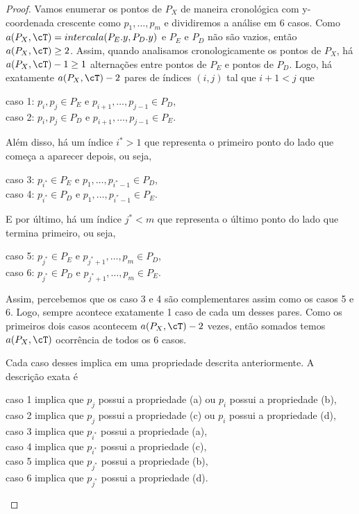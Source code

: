 \begin{proof}
    Vamos enumerar os pontos de $P_X$ de maneira cronológica com y-coordenada crescente como $p_1,\ldots,p_m$ e dividiremos a análise em 6 casos.
    Como $a(P_X,\cT) = intercala(P_E.y,P_D.y)$ e $P_E$ e $P_D$ não são vazios, então $a(P_X,\cT) \geq 2$. Assim, quando analisamos cronologicamente os pontos de $P_X$, há $a(P_X,\cT) - 1 \geq 1$ alternações entre pontos de $P_E$ e pontos de $P_D$. Logo, há exatamente $a(P_X,\cT) - 2$ pares de índices $(i,j)$ tal que $i + 1 < j$ que 
    \begin{center}
        caso 1: $p_i,p_j \in P_E$ e $p_{i+1},\ldots,p_{j-1} \in P_D$,\\
        caso 2: $p_i,p_j \in P_D$ e $p_{i+1},\ldots,p_{j-1} \in P_E$.
    \end{center}

    Além disso, há um índice $i^{*} > 1$ que representa o primeiro ponto do lado que começa a aparecer depois, ou seja,
    \begin{center}
        caso 3: $p_{i^{*}} \in P_E$ e $p_1,\ldots,p_{i^{*}-1} \in P_D$,\\
        caso 4: $p_{i^{*}}  \in P_D$ e $p_1,\ldots,p_{i^{*}-1} \in P_E$.
    \end{center}

    E por último, há um índice $j^{*} < m$ que representa o último ponto do lado que termina primeiro, ou seja,
    \begin{center}
        caso 5: $p_{j^{*}} \in P_E$ e $p_{j^{*} + 1},\ldots,p_m \in P_D$,\\
        caso 6: $p_{j^{*}}  \in P_D$ e $p_{j^{*} + 1},\ldots,p_m \in P_E$.
    \end{center} 

    Assim, percebemos que os caso 3 e 4 são complementares assim como os casos 5 e 6. Logo, sempre acontece exatamente 1 caso de cada um desses pares. Como os primeiros dois casos acontecem $a(P_X,\cT) - 2$ vezes, então somados temos $a(P_X,\cT)$ ocorrência de todos os 6 casos.

    Cada caso desses implica em uma propriedade descrita anteriormente. A descrição exata é
    \begin{center}
        caso 1 implica que $p_j$ possui a propriedade (a) ou $p_i$ possui a propriedade (b),\\
        caso 2 implica que $p_j$ possui a propriedade (c) ou $p_i$ possui a propriedade (d),\\
        caso 3 implica que $p_{i^{*}}$ possui a propriedade (a),\\
        caso 4 implica que $p_{i^{*}}$ possui a propriedade (c),\\
        caso 5 implica que $p_{j^{*}}$ possui a propriedade (b),\\
        caso 6 implica que $p_{j^{*}}$ possui a propriedade (d).
    \end{center}


\end{proof}
